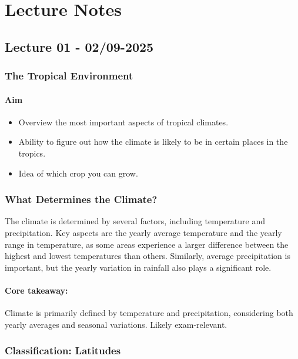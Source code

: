 \setcounter{chapter}{0}
\setcounter{section}{0}
\chapter{Lecture Notes}
\setlength{\headheight}{12.71342pt}
\addtolength{\topmargin}{-0.71342pt}

\section{Lecture 01 - 02/09-2025}
\subsection{The Tropical Environment} 

\subsubsection*{Aim} 
\begin{itemize} 
    \item Overview the most important aspects of tropical climates. 
    \item Ability to figure out how the climate is likely to be in certain places in the tropics. 
    \item Idea of which crop you can grow. 
\end{itemize}

\subsection{What Determines the Climate?} 
The climate is determined by several factors, including temperature and precipitation. Key aspects are the yearly average temperature and the yearly range in temperature, as some areas experience a larger difference between the highest and lowest temperatures than others. Similarly, average precipitation is important, but the yearly variation in rainfall also plays a significant role.
\subsubsection*{Core takeaway:} 
Climate is primarily defined by temperature and precipitation, considering both yearly averages and seasonal variations. Likely exam-relevant.

\subsection{Classification: Latitudes} 

